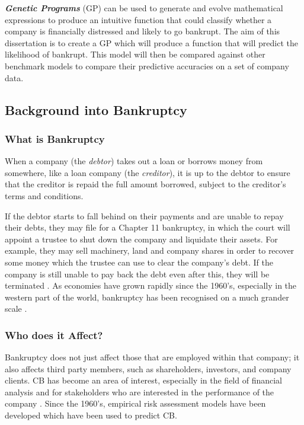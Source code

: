 \documentclass[11pt]{article}
\begin{document}
\textbf{\textit{Genetic Programs}} (GP) can be used to generate and evolve mathematical expressions to produce an intuitive function that could classify whether a company is financially distressed and likely to go bankrupt. The aim of this dissertation is to create a GP which will produce a function that will predict the likelihood of bankrupt. This model will then be compared against other benchmark models to compare their predictive accuracies on a set of company data. \\
\subsection{Background into Bankruptcy}\label{subsec:intro2B}
\subsubsection{What is Bankruptcy}\label{subsubsec:bankdef}
When a company (the \textit{debtor}) takes out a loan or borrows money from somewhere, like a loan company (the \textit{creditor}), it is up to the debtor to ensure that the creditor is repaid the full amount borrowed, subject to the creditor's terms and conditions.

If the debtor starts to fall behind on their payments and are unable to repay their debts, they may file for a Chapter 11 bankruptcy, in which the court will appoint a trustee to shut down the company and liquidate their assets. For example, they may sell machinery, land and company shares in order to recover some money which the trustee can use to clear the company's debt. If the company is still unable to pay back the debt even after this, they will be terminated \cite{ref-deb}. As economies have grown rapidly since the 1960's, especially in the western part of the world, bankruptcy has been recognised on a much grander scale \cite{ref-three}.
\subsubsection{Who does it Affect?}\label{subsubsec:affect}
Bankruptcy does not just affect those that are employed within that company; it also affects third party members, such as shareholders, investors, and company clients. CB has become an area of interest, especially in the field of financial analysis and for stakeholders who are interested in the performance of the company \cite{ref-four}. Since the 1960's, empirical risk assessment models have been developed which have been used to predict CB. 
\end{document}
